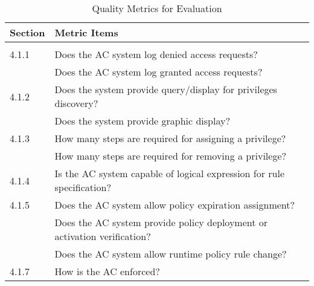 {
\renewcommand{\arraystretch}{1.5}%
\begin{table}[h]
	\centering
	\small

	\caption{Quality Metrics for Evaluation}
	\label{tab:qualityMetrics}
	\begin{tabular}{l|l}
		\hline \bf Section & \bf Metric Items                                                                                                      \\ \hline
		\rowcolor{lightgray} \multicolumn{2}{l}{Administration Properties}                                                                         \\ \hline
		4.1.1              & \llap{\textbullet} Does the AC system log denied access requests?                                                     \\
		                   & \llap{\textbullet} Does the AC system log granted access requests?                                                    \\ \hline
		4.1.2              & \llap{\textbullet} Does the system provide query/display for privileges discovery?                                    \\
		                   & \llap{\textbullet} Does the system provide graphic display?                                                           \\ \hline
		4.1.3              & \llap{\textbullet} How many steps are required for assigning a privilege?                                             \\
		                   & \llap{\textbullet} How many steps are required for removing a privilege?                                              \\ \hline
		4.1.4              & \llap{\textbullet} Is the AC system capable of logical expression for rule specification?                             \\ \hline
		4.1.5              & \llap{\textbullet} Does the AC system allow policy expiration assignment?                                             \\
		                   & \llap{\textbullet} Does the AC system provide policy deployment or activation verification?                           \\
		                   & \llap{\textbullet} Does the AC system allow runtime policy rule change?                                               \\ \hline
		4.1.7              & \llap{\textbullet} How is the AC enforced?                                                                            \\ \hline

\end{tabular}
\end{table}}
